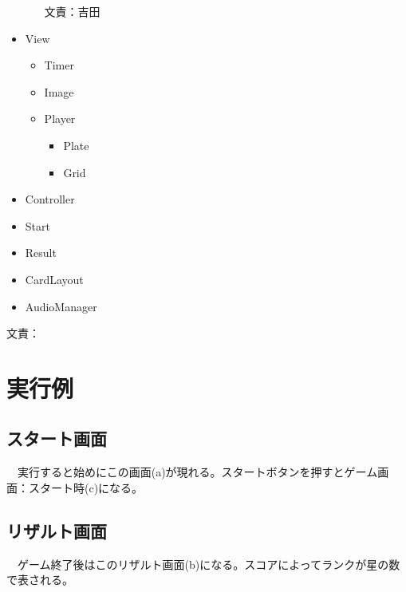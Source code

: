\documentclass[a4j]{jsarticle} %
\begin{document}
\begin{itemize}
\begin{itemize}
    文責：吉田
  \end{itemize}   
  \item View\par
  \begin{itemize}
    \item Timer\par
    \item Image\par
    \item Player\par
    \begin{itemize}
      \item Plate\par
      \item Grid\par
    \end{itemize}   
  \end{itemize}  
  \item Controller\par
  \item Start\par
  \item Result\par
  \item CardLayout\par
  \item AudioManager\par
\end{itemize}
文責：%



\section{実行例}
\subsection*{スタート画面}
　実行すると始めにこの画面(a)が現れる。スタートボタンを押すとゲーム画面：スタート時(c)になる。
\subsection*{リザルト画面}
　ゲーム終了後はこのリザルト画面(b)になる。スコアによってランクが星の数で表される。
\end{document}
